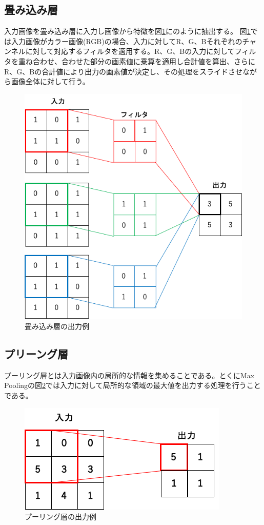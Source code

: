 \subsection{畳み込み層}
入力画像を畳み込み層に入力し画像から特徴を図\ref{tatami}にのように抽出する。
図\ref{tatami}では入力画像がカラー画像(RGB)の場合、入力に対してR、G、Bそれぞれのチャンネルに対して対応するフィルタを適用する。R、G、Bの入力に対してフィルタを重ね合わせ、合わせた部分の画素値に乗算を適用し合計値を算出、さらにR、G、Bの合計値により出力の画素値が決定し、その処理をスライドさせながら画像全体に対して行う。
\begin{figure}[H]
 \centering
 \includegraphics[keepaspectratio, scale=0.4]{fig/chapter2/tatamikomi.png}
 \caption{畳み込み層の出力例}
 \label{tatami}
\end{figure}

\subsection{プリーング層}
プーリング層とは入力画像内の局所的な情報を集めることである。とくにMax Poolingの図\ref{pooling}では入力に対して局所的な領域の最大値を出力する処理を行うことである。

\begin{figure}[H]
 \centering
 \includegraphics[keepaspectratio, scale=0.5]{fig/chapter2/pooling.png}
 \caption{プーリング層の出力例}
 \label{pooling}
\end{figure}


